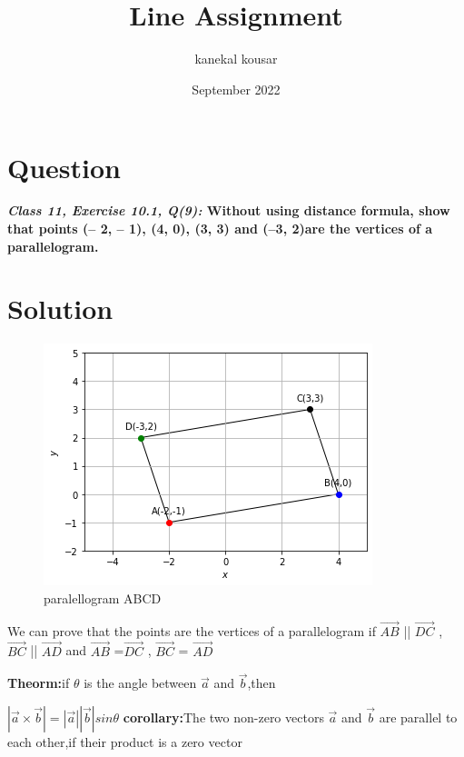 \documentclass[journal,12pt,twocolumn]{IEEEtran}
\title{\textbf{\\Line Assignment}}
\author{kanekal kousar}
\date{September 2022}
\begin{document}
\maketitle


\section{Question}
\textbf{\textit{Class 11, Exercise 10.1, Q(9):} Without using distance formula, show that points (– 2, – 1), (4, 0), (3, 3) and (–3, 2)are the vertices of a parallelogram.}

\section{Solution}
\raggedright 

\begin{figure}[h!]
\centering
\includegraphics[scale=0.5]{fig/paralellogram.png} 
\caption{paralellogram ABCD}
\end{figure}

\vspace{0.25cm}
We can prove that the points are the vertices of a parallelogram if  \textbf{$\vec{AB}$} || \textbf{$\vec{DC}$} , \textbf{$\vec{BC}$} || \textbf{$\vec{AD}$} and  \textbf{$\vec{AB}$} =\textbf{$\vec{DC}$} , \textbf{$\vec{BC}$} = \textbf{$\vec{AD}$}
\vspace{0.3cm}

\textbf{Theorm:}if $\theta$ is the angle between $\vec{a}$ and $\vec{b}$,then

\hspace{3cm}
\boldmath
	$|\vec{a}\times \vec{b}|=|\vec{a}|| \vec{b}|sin\theta$
\unboldmath
\vspace{0.25cm}
\textbf{corollary:}The two non-zero vectors $\vec{a}$ and $\vec{b}$ are parallel to each other,if their product is a zero vector
\end{document}
